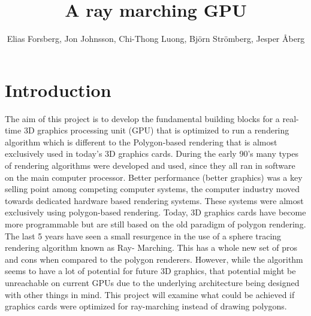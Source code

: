 \documentclass[a4paper]{article}
\author{Elias Forsberg, Jon Johnsson, Chi-Thong Luong, 
	Björn Strömberg, Jesper Åberg}
\title{A ray marching GPU}
\begin{document}
\maketitle

\chapter{Introduction}

The aim of this project is to develop the fundamental building blocks for a real-time 3D 
graphics processing unit (GPU) that is optimized to run a rendering algorithm which is 
different to the Polygon-based rendering that is almost exclusively used in today's 3D 
graphics cards. During the early 90’s many types of rendering algorithms were developed and 
used, since they all ran in software on the main computer processor. Better performance 
(better graphics) was a key selling point among competing computer systems, the computer 
industry moved towards dedicated hardware based rendering systems. These systems were 
almost exclusively using polygon-based rendering. Today, 3D graphics cards have become more 
programmable but are still based on the old paradigm of polygon rendering. The last 5 years 
have seen a small resurgence in the use of a sphere tracing rendering algorithm known as Ray-
Marching. This has a whole new set of pros and cons when compared to the polygon renderers. 
However, while the algorithm seems to have a lot of potential for future 3D graphics, that 
potential might be unreachable on current GPUs due to the underlying architecture being 
designed with other things in mind. This project will examine what could be achieved if 
graphics cards were optimized for ray-marching instead of drawing polygons.

\newpage
\appendix
\end{document}
